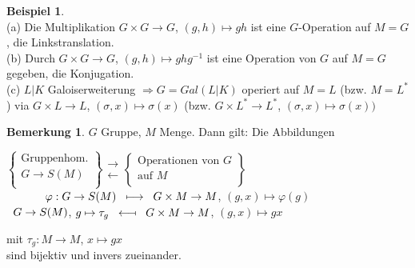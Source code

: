 \documentclass[10pt,a4paper,numbers=endperiod]{scrreprt}
\theoremstyle{definition}
\newtheorem{bem}[satz]{Bemerkung}
\newtheorem{bsp}[satz]{Beispiel}
\begin{document}
\begin{bsp}
	$ $\\
	(a) Die Multiplikation $G \times G \rightarrow G$, $(g,h) \mapsto gh$ ist eine $G$-Operation auf $M = G$, die Linkstranslation.\\
	(b) Durch $G \times G \rightarrow G$, $(g,h) \mapsto ghg^{-1}$ ist eine Operation von $G$ auf $M = G$ gegeben, die Konjugation.\\
	(c) $L|K$ Galoiserweiterung $\Rightarrow G = Gal(L|K)$ operiert auf $M = L$ (bzw. $M = L^*$) via $G \times L \rightarrow L$, $(\sigma, x) \mapsto \sigma(x)$ (bzw. $G \times L^* \rightarrow L^*$, $(\sigma,x) \mapsto \sigma(x))$ 
\end{bsp}

\begin{bem}
	$G$ Gruppe, $M$ Menge. Dann gilt: Die Abbildungen
	\begin{center}
		$\left\{ \begin{matrix}
		\text{Gruppenhom.}\\
		G \rightarrow S(M)\\
		\end{matrix}  \right\} 
	\begin{matrix}
	\longrightarrow\\
	\longleftarrow 
	\end{matrix} \left\{ \begin{matrix}
		\text{Operationen von } G\\
		   \text{auf } M\\
		\end{matrix} \right\}$ \\
		
	 $ \hspace{12mm} \varphi: G \rightarrow S(M) \hspace{2mm} \longmapsto \hspace{2mm} G \times M \rightarrow M$, $(g,x) \mapsto \varphi(g)$\\
	
	$\hspace{2mm} G \rightarrow S(M)$, $g \mapsto \tau_g \hspace{2mm} \longmapsfrom \hspace{2mm} G \times M \rightarrow M$, $(g,x) \mapsto gx$\\
\end{center}
	mit $\tau_g: M \rightarrow M$, $x \mapsto gx$\\
	sind bijektiv und invers zueinander. 
\end{bem}
\end{document}

